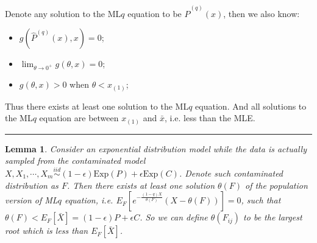 \documentclass[a4paper]{article}
\newenvironment{proof}{{\bf Proof:  }}{\hfill\rule{2mm}{2mm}}
\newtheorem{lemma}[fact]{Lemma}
\renewcommand{\hat}{\widehat}
\begin{document}
\begin{proof}
Denote any solution to the ML$q$ equation to be $\hat{P}^{(q)}(x)$, then we also know:
\begin{itemize}
\item $g(\hat{P}^{(q)}(x), x) = 0$;
\item $\lim_{\theta \rightarrow 0^+}g(\theta, x) = 0$;
\item $g(\theta, x) > 0$ when $\theta < x_{(1)}$;
\end{itemize}

Thus there exists at least one solution to the ML$q$ equation. And all solutions to the ML$q$ equation are between $x_{(1)}$ and $\bar{x}$, i.e. less than the MLE.
\end{proof}

\begin{lemma}
\label{lemma:PopulationLqExist}
Consider an exponential distribution model while the data is actually sampled from the contaminated model $X, X_1, \cdots, X_m \stackrel{iid}{\sim} (1-\epsilon) \mathrm{Exp}(P) + \epsilon \mathrm{Exp}(C)$. Denote such contaminated distribution as $F$.
Then there exists at least one solution $\theta(F)$ of the population version of ML$q$ equation,
i.e. $E_F[e^{-\frac{(1-q)X}{\theta(F)}}(X - \theta(F))] = 0$, such that $\theta(F) < E_F[\bar{X}] = (1-\epsilon) P + \epsilon C$.
So we can define $\theta(F_{ij})$ to be the largest root which is less than $E_F[\bar{X}]$.
\end{lemma}
\end{document}
